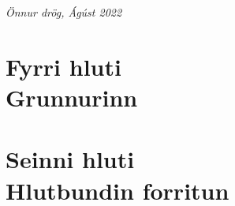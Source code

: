 \documentclass[11pt,fleqn]{book} %
\begin{document}
\noindent \textit{Önnur drög, Ágúst 2022} %


\usechapterimagetrue %


\pagestyle{empty} %

\tableofcontents %

\cleardoublepage %

\pagestyle{fancy} %


\part{Fyrri hluti\\ Grunnurinn}






















\part{Seinni hluti\\ Hlutbundin forritun}\label{Seinni hluti - hlutbundin forritun}
\end{document}

